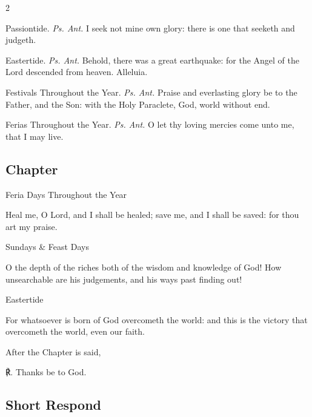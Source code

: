 \begin{multicols}{2}
\par\noindent
{\color{RubricRed}Passiontide.} \textit{Ps. Ant.} I seek not mine own glory: there is one that seeketh and judgeth.
\par\noindent
{\color{RubricRed}Eastertide.} \textit{Ps. Ant.} Behold, there was a great earthquake: for the Angel of the Lord descended from heaven. Alleluia.
\par\noindent
{\color{RubricRed}Festivals Throughout the Year.} \textit{Ps. Ant.} Praise and everlasting glory be to the Father, and the Son: with the Holy Paraclete, God, world without end.
\par\noindent
{\color{RubricRed}Ferias Throughout the Year.} \textit{Ps. Ant.} O let thy loving mercies come unto me, that I may live.

\vspace{-0.6\baselineskip}

\subsection{Chapter}

\vspace{-0.4\baselineskip}

\begin{inhead}
	Feria Days Throughout the Year
\end{inhead}\par\noindent
Heal me, O Lord, and I shall be healed; save me, and I shall be saved: for thou art my praise.

\begin{inhead}
	Sundays \& Feast Days
\end{inhead}\par\noindent
O the depth of the riches both of the wisdom and knowledge of God! How unsearchable are his judgements, and his ways past finding out!

\begin{inhead}
	Eastertide
\end{inhead}\par\noindent
For whatsoever is born of God overcometh the world: and this is the victory that overcometh the world, even our faith.

\begin{rubric}
	After the Chapter is said,
\end{rubric}

℟. Thanks be to God.

\subsection{Short Respond}


\end{multicols}
